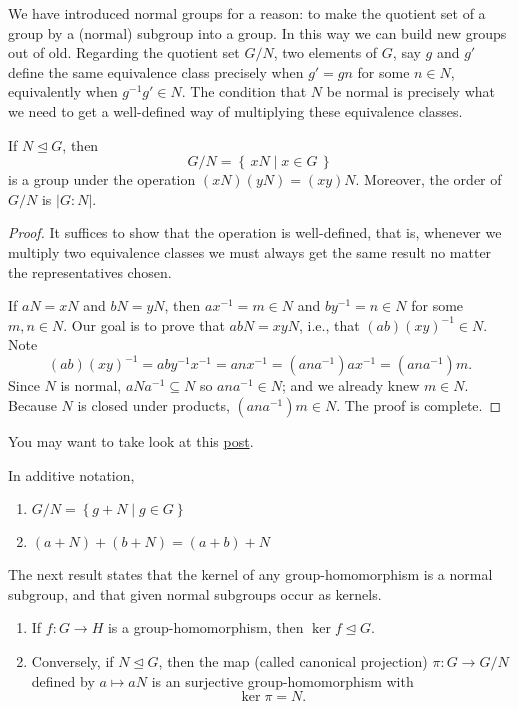 \documentclass[11pt,a4paper]{article}
\begin{document}
We have introduced normal groups for a reason: to make the quotient set of a group by a (normal) subgroup into a group.
In this way we can build new groups out of old.
Regarding the quotient set \(G/N\), two elements of  \(G\), say \(g\) and \(g'\) define the same equivalence class precisely when \(g' = gn\)  for some \(n\in N\), equivalently when \(g^{-1} g'  \in N\).
The condition that \(N\) be normal is precisely what we need to get a well-defined way of multiplying these equivalence classes.

\begin{teo}
    If \(N\unlhd G\), then 
    \[G/N = \left\{ \,xN \mid x \in G \,\right\}\]
    is a group under the operation \((xN)(yN) = (xy) N\).
    Moreover, the order of \(G/N\) is \(|G: N|\).
\end{teo}

\begin{proof}
It suffices to show that the operation is well-defined, that is, whenever we multiply two equivalence classes we must always get the same result no matter the representatives chosen.

If \(aN = xN\) and \(bN= yN\), then \(ax^{-1} = m \in N\) and \(by^{-1} = n \in N\) for some \(m,n\in N\).
Our goal is to prove that \(ab N = xy N\), i.e., that \((ab)(xy)^{-1}\in N\).
Note \[(ab)(xy)^{-1}=aby^{-1}x^{-1} = anx^{-1} = (an a^{-1})a x^{-1} =(an a^{-1}) m.\]
Since \(N\) is normal, \(aNa^{-1} \subseteq  N\) so \(ana^{-1} \in N\); and we already knew \(m\in N\).
Because \(N\) is closed under products, \((an a^{-1}) m \in N\).
The proof is complete.
\end{proof}

You may want to take look at this \href{https://math.stackexchange.com/questions/14282/why-do-we-define-quotient-groups-for-normal-subgroups-only}{post}.


\begin{rem}
In additive notation, 
\begin{enumerate}[label=(\roman*)]
    \item \(G/N = \left\{ g+N \mid g\in G \right\}\)
    \item \((a+N)+(b+N) = (a+b) + N\)
\end{enumerate}
\end{rem}

The next result states that the kernel of any group-homomorphism is a normal subgroup, and that given normal subgroups occur as kernels.

\begin{teo}\hfill
\begin{enumerate}[label=(\roman*)]
    \item If \( f: G \to H \) is a group-homomorphism, then \( \ker f \trianglelefteq G \).
    \item Conversely, if \( N \trianglelefteq G \), then the map (called canonical projection) \( \pi: G \to G/N \) defined by \( a \mapsto aN \) is an surjective group-homomorphism with \[ \ker \pi = N .\]
\end{enumerate}
    

\end{teo}
\end{document}
